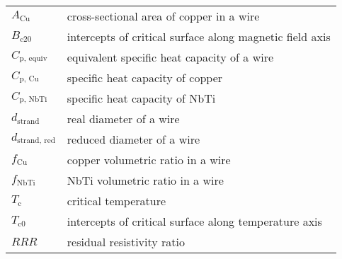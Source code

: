 
\begin{table}[h!]
    \vspace{-1.em} 
    \fontsize{10}{10}
    \selectfont 
    \renewcommand{\arraystretch}{1.5}
    \begin{center}
    \begin{tabular}{ l l }  
    \hline
    $A_\text{Cu}$ & cross-sectional area of copper in a wire \\  
    $B_\text{c20}$ & intercepts of critical surface along magnetic field axis \\  
    $C_\text{p, equiv}$ & equivalent specific heat capacity of a wire \\  
    $C_\text{p, Cu}$ & specific heat capacity of copper \\   
    $C_\text{p, NbTi}$ & specific heat capacity of NbTi \\  
    $d_\text{strand}$ & real diameter of a wire \\  
    $d_\text{strand, red}$ & reduced diameter of a wire \\   
    $f_\text{Cu}$ &  copper volumetric ratio in a wire\\        
    $f_\text{NbTi}$ &  NbTi volumetric ratio in a wire\\   
    $T_\text{c}$ & critical temperature \\
    $T_\text{c0}$ & intercepts of critical surface along temperature axis \\
    $RRR$ & residual resistivity ratio \\
    \hline
     \end{tabular} 
    \end{center}  
 \end{table}
